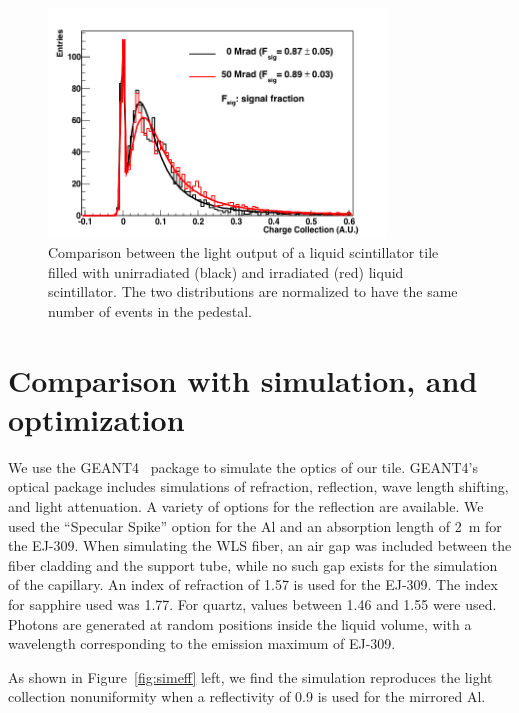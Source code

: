 \documentclass[review]{elsarticle}
\begin{document}
\begin{figure}[!ht]
\begin{center}
\includegraphics[width=0.8\textwidth]{./figures/RD_R7600_1_0_DBF_ALM_GRS_TH450_100814_all_1.png}
\caption{Comparison between the light output of a liquid scintillator
  tile filled with unirradiated (black) and irradiated (red) liquid
  scintillator. The two distributions are normalized to have the same
  number of events in the pedestal.}
\label{fig:ej309_irradiated}
\end{center}
\end{figure}


\section{Comparison with simulation, and optimization}
We use the GEANT4~\cite{Agostinelli2003250} package to simulate the
optics of our tile. GEANT4's optical package includes simulations of
refraction, reflection, wave length shifting, and light attenuation.
A variety of options for the reflection are available. We used the
``Specular Spike'' option for the Al and an absorption length of 2~m for
the EJ-309. When simulating the WLS fiber, an air gap was included
between the fiber cladding and the support tube, while no such gap
exists for the simulation of the capillary. An index of refraction of
1.57 is used for the EJ-309. The index for sapphire used was 1.77.
For quartz, values between 1.46 and 1.55 were used. Photons are
generated at random positions inside the liquid volume, with a
wavelength corresponding to the emission maximum of EJ-309.

As shown in Figure~\ref{fig:simeff} left, we find the simulation
reproduces the light collection nonuniformity when a reflectivity of
0.9 is used for the mirrored Al.
\end{document}
